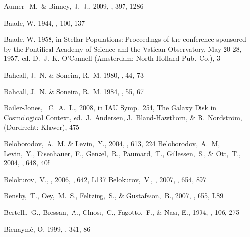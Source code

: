 \begin{thebibliography}{99}
  Aumer,~M.~\& Binney,~J.~J., 2009,
  \mnras, 397, 1286

{Baade}, W. 1944, \apj, 100, 137

{Baade}, W. 1958, in {Stellar Populations: Proceedings of the conference
  sponsored by the Pontifical Academy of Science and the Vatican Observatory,
  May 20-28, 1957}, ed. D.~J.~K. {O'Connell} ({Amsterdam}: {North-Holland
  Pub.~Co.}), 3

{Bahcall}, J.~N. \& {Soneira}, R.~M. 1980, \apjs, 44, 73

{Bahcall}, J.~N. \& {Soneira}, R.~M. 1984, \apjs, 55, 67

  Bailer-Jones, ~C.~A.~L., 2008,
  in IAU Symp.~254, The Galaxy Disk in Cosmological Context, ed.~J.~Andersen, J.~Bland-Hawthorn, \& B.~Nordstr\"{o}m, (Dordrecht: Kluwer), 475  

  Beloborodov,~A.~M. \& Levin,~Y., 2004,
  \apj, 613, 224
  Beloborodov,~A.~M, Levin,~Y., Eisenhauer,~F., Genzel,~R., 
  Paumard,~T., Gillessen,~S.,
  \& Ott,~T., 2004,
  \apj, 648, 405

  Belokurov,~V., \etal, 2006,
  \apjl, 642, L137
  Belokurov,~V., \etal, 2007,
  \apj, 654, 897

  Bensby,~T., Oey,~M.~S., Feltzing,~S., \& Gustafsson,~B., 2007,
  \apjl, 655, L89

  Bertelli,~G., Bressan,~A., Chiosi,~C., Fagotto,~F., \& Nasi, E., 1994,
  \aaps, 106, 275

{Bienaym{\'e}}, O. 1999, \aap, 341, 86


\end{thebibliography}
